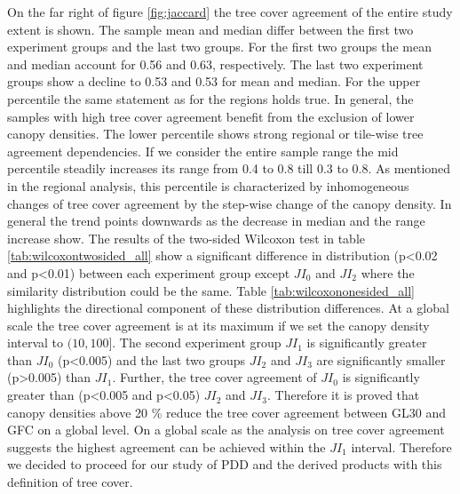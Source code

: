 			On the far right of figure \ref{fig:jaccard} the tree cover agreement of the entire study extent is shown. The sample mean and median differ between the first two experiment groups and the last two groups. For the first two groups the mean and median account for 0.56 and 0.63, respectively. The last two experiment groups show a decline to 0.53 and 0.53 for mean and median. For the upper percentile the same statement as for the regions holds true. In general, the samples with high tree cover agreement benefit from the exclusion of lower canopy densities. The lower percentile shows strong regional or tile-wise tree agreement dependencies. If we consider the entire sample range the mid percentile steadily increases its range from 0.4 to 0.8 till 0.3 to 0.8. As mentioned in the regional analysis, this percentile is characterized by inhomogeneous changes of tree cover agreement by the step-wise change of the canopy density. In general the trend points downwards as the decrease in median and the range increase show. The results of the two-sided Wilcoxon test in table \ref{tab:wilcoxontwosided_all} show a significant difference in distribution (p<0.02 and p<0.01) between each experiment group except $JI_0$ and $JI_2$ where the similarity distribution could be the same. Table \ref{tab:wilcoxononesided_all} highlights the directional component of these distribution differences. At a global scale the tree cover agreement is at its maximum if we set the canopy density interval to $(10,100]$. The second experiment group $JI_1$ is significantly greater than $JI_0$ (p<0.005) and the last two groups $JI_2$ and $JI_3$ are significantly smaller (p>0.005) than $JI_1$. Further, the tree cover agreement of $JI_0$ is significantly greater than (p<0.005 and p<0.05) $JI_2$ and $JI_3$. Therefore it is proved that canopy densities above 20 \% reduce the tree cover agreement between \ac{GL30} and \ac{GFC} on a global level. On a global scale as the analysis on tree cover agreement suggests the highest agreement can be achieved within the $JI_1$ interval. Therefore we decided to proceed for our study of \ac{PDD} and the derived products with this definition of tree cover.
